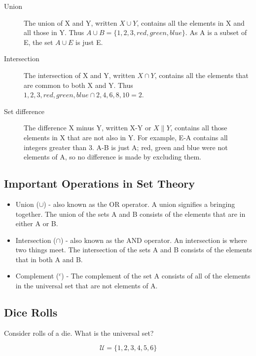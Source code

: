 \documentclass[11pt,a4paper,titlepage,oneside,openany]{article}
\numberwithin{equation}{section}
\numberwithin{algorithm}{section}
\numberwithin{figure}{section}
\numberwithin{table}{section}
\begin{document}
\begin{description}
\item[Union]
The union of X and Y, written $X\cup Y$, contains all the elements in X and all those in Y. Thus $A \cup B = \{1, 2, 3, red, green, blue\}$. 
As A is a subset of E, the set $A \cup E$ is just E.

\item[Intersection]

The intersection of X and Y, written $X \cap Y$, contains all the elements that are common to both X and Y. Thus ${1,2,3,red,green,blue} \cap {2,4,6,8,10} = {2}$.

\item[Set difference]

The difference X minus Y, written X-Y or $X\|Y$, contains all those elements in X that are not also in Y. For example, E-A contains all integers greater than 3. 
A-B is just A; red, green and blue were not elements of A, so no difference is made by excluding them.
\end{description}


\subsection{Important Operations in Set Theory}

\begin{itemize}
\item Union ($\cup$) - also known as the OR operator. A union signifies a bringing together. The union of the sets A and B consists of the elements that are in either A or B.
\item Intersection ($\cap$) - also known as the AND operator. An intersection is where two things meet. The intersection of the sets A and B consists of the elements that in both A and B.
\item Complement ($^{c}$) - The complement of the set A consists of all of the elements in the universal set that are not elements of A.
\end{itemize}

\subsection*{Dice Rolls}
Consider rolls of a die. What is the universal set?

\[ \mathcal{U} = \{1,2,3,4,5,6\} \]
\end{document}
